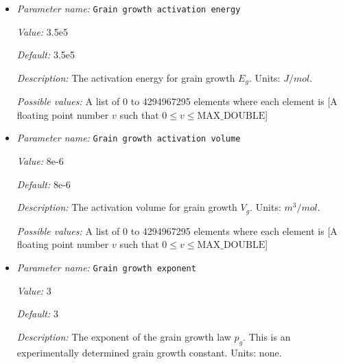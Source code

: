 \begin{itemize}
{\it Value:} 3


{\it Default:} 3


{\it Description:} The geometric constant $c$ used in the paleowattmeter grain size reduction law. Units: none.


{\it Possible values:} A list of 0 to 4294967295 elements where each element is [A floating point number $v$ such that $0 \leq v \leq \text{MAX\_DOUBLE}$]
\item {\it Parameter name:} {\tt Grain growth activation energy}
\label{parameters:Material model/Grain size model/Grain growth activation energy}


{\it Value:} 3.5e5


{\it Default:} 3.5e5


{\it Description:} The activation energy for grain growth $E_g$. Units: $J/mol$.


{\it Possible values:} A list of 0 to 4294967295 elements where each element is [A floating point number $v$ such that $0 \leq v \leq \text{MAX\_DOUBLE}$]
\item {\it Parameter name:} {\tt Grain growth activation volume}
\label{parameters:Material model/Grain size model/Grain growth activation volume}


{\it Value:} 8e-6


{\it Default:} 8e-6


{\it Description:} The activation volume for grain growth $V_g$. Units: $m^3/mol$.


{\it Possible values:} A list of 0 to 4294967295 elements where each element is [A floating point number $v$ such that $0 \leq v \leq \text{MAX\_DOUBLE}$]
\item {\it Parameter name:} {\tt Grain growth exponent}
\label{parameters:Material model/Grain size model/Grain growth exponent}


{\it Value:} 3


{\it Default:} 3


{\it Description:} The exponent of the grain growth law $p_g$. This is an experimentally determined grain growth constant. Units: none.



\end{itemize}
